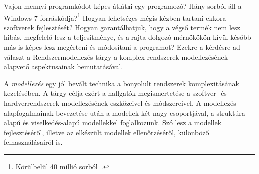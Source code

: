 
Vajon mennyi programkódot képes átlátni egy programozó? Hány sorból áll a Windows 7 forráskódja?\footnote{Körülbelül 40 millió sorból~\cite{loc-infographic}.} Hogyan lehetséges mégis kézben tartani ekkora szoftverek fejlesztését? Hogyan garantálhatjuk, hogy a végső termék nem lesz hibás, megfelelő lesz a teljesítménye, és a rajta dolgozó mérnökökön kívül később más is képes lesz megérteni és módosítani a programot? Ezekre a kérdésre ad választ a Rendszermodellezés tárgy a komplex rendszerek modellezésének alapvető aspektusainak bemutatásával.

A \emph{modellezés} egy jól bevált technika a bonyolult rendszerek komplexitásának kezelésében. A tárgy célja ezért a hallgatók megismertetése a szoftver- és hardverrendszerek modellezésének eszközeivel és módszereivel. A modellezés alapfogalmainak bevezetése után a modellek két nagy csoportjával, a struktúra-alapú és viselkedés-alapú modellekkel foglalkozunk. Szó lesz a modellek fejlesztéséről, illetve az elkészült modellek ellenőrzéséről, különböző felhasználásairól is.

